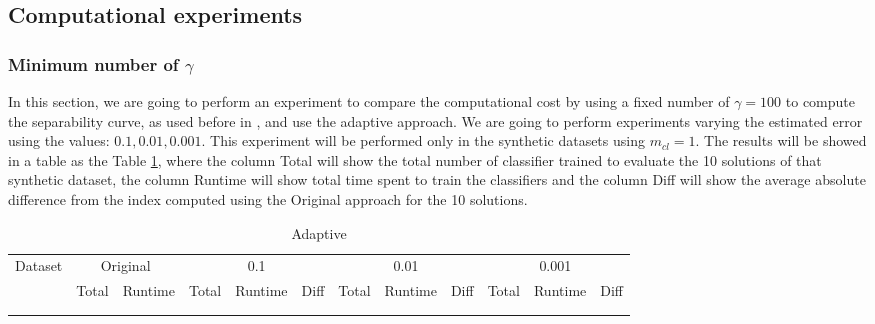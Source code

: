 \documentclass[11pt]{article}
\begin{document}
{\subsection{Computational experiments}

\subsubsection{Minimum number of $\gamma$}
In this section, we are going to perform an experiment to compare the computational cost by using a fixed number of $\gamma = 100$ to compute the separability curve, as used before in \cite{marques2015}, and use the adaptive approach. We are going to perform experiments varying the estimated error using the values: ${0.1, 0.01, 0.001}$. This experiment will be performed only in the synthetic datasets using $m_{cl} = 1$. The results will be showed in a table as the Table \ref{tab:adaptive}, where the column Total will show the total number of classifier trained to evaluate the 10 solutions of that synthetic dataset, the column Runtime will show total time spent to train the classifiers and the column Diff will show the average absolute difference from the index computed using the Original approach for the 10 solutions.

\begin{table}[h!]
\centering
\caption{Adaptive}
\label{tab:adaptive}
\begin{tabular}{|l|ll|lll|lll|lll|}
\hline
\multirow{2}{*}{Dataset} & \multicolumn{2}{c|}{Original} & \multicolumn{3}{c|}{0.1} & \multicolumn{3}{c|}{0.01} & \multicolumn{3}{c|}{0.001} \\ \cline{2-12} 
                         & Total        & Runtime        & Total  & Runtime  & Diff & Total  & Runtime  & Diff  & Total   & Runtime  & Diff  \\ \hline
                         &              &                &        &          &      &        &          &       &         &          &       \\
                         &              &                &        &          &      &        &          &       &         &          &       \\ \hline
\end{tabular}
\end{table}

}
\end{document}
